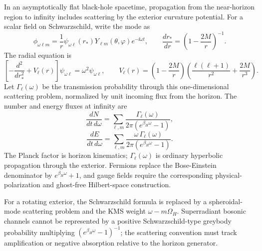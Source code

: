 In an asymptotically flat black-hole spacetime, propagation from the
near-horizon region to infinity includes scattering by the exterior curvature
potential.  For a scalar field on Schwarzschild, write the mode as
\[
  \phi_{\omega\ell m}
  =
  \frac{1}{r}\psi_{\omega\ell}(r_\ast)Y_{\ell m}(\theta,\varphi)
  e^{-\ii\omega t},
  \qquad
  \frac{dr_\ast}{dr}=\left(1-\frac{2M}{r}\right)^{-1}.
\]
The radial equation is
\[
  \left[
  -\frac{d^2}{dr_\ast^2}
  +V_\ell(r)
  \right]\psi_{\omega\ell}
  =
  \omega^2\psi_{\omega\ell},
  \qquad
  V_\ell(r)=
  \left(1-\frac{2M}{r}\right)
  \left(\frac{\ell(\ell+1)}{r^2}+\frac{2M}{r^3}\right).
\]
Let \(\Gamma_\ell(\omega)\) be the transmission probability through this
one-dimensional scattering problem, normalized by unit incoming flux from
the horizon.  The number and energy fluxes at infinity are
\[
  \frac{dN}{dt\,d\omega}
  =
  \sum_{\ell,m}
  \frac{\Gamma_\ell(\omega)}
  {2\pi(e^{\beta_H\omega}-1)},
\]
\[
  \frac{dE}{dt\,d\omega}
  =
  \sum_{\ell,m}
  \frac{\omega\,\Gamma_\ell(\omega)}
  {2\pi(e^{\beta_H\omega}-1)} .
\]
The Planck factor is horizon kinematics; \(\Gamma_\ell(\omega)\) is ordinary
hyperbolic propagation through the exterior.  Fermions replace the
Bose-Einstein denominator by \(e^{\beta_H\omega}+1\), and gauge fields
require the corresponding physical-polarization and ghost-free Hilbert-space
construction.

For a rotating exterior, the Schwarzschild formula is replaced by a
spheroidal-mode scattering problem and the KMS weight
\(\omega-m\Omega_H\).  Superradiant bosonic channels cannot be represented by
a positive Schwarzschild-type greybody probability multiplying
\((e^{\beta_H\omega}-1)^{-1}\); the scattering convention must track
amplification or negative absorption relative to the horizon generator.


